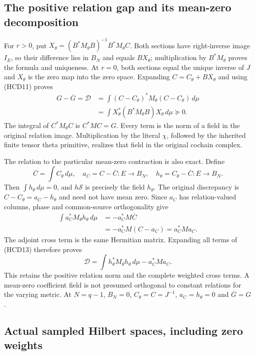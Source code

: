 \subsection{The positive relation gap and its mean-zero decomposition}

For $r>0$, put
$X_\theta=(B^*M_\theta B)^{-1}B^*M_\theta C$.
Both sections have right-inverse image $I_E$, so their difference
lies in $B_N$ and equals $BX_\theta$; multiplication by
$B^*M_\theta$ proves the formula and uniqueness.
At $r=0$, both sections equal the unique inverse of $J$ and
$X_\theta$ is the zero map into the zero space.
Expanding $C=C_\theta+BX_\theta$ and using (HCD11) proves
\[
 \boxed{
 \begin{aligned}
 G-\overline G=\mathscr D
 &=\int(C-C_\theta)^*M_\theta(C-C_\theta)\,d\mu\\
 &=\int X_\theta^*(B^*M_\theta B)X_\theta\,d\mu\succeq0.
 \end{aligned}}
 \tag{HCD13}
\]
The integral of $C^*M_\theta C$ is $C^*MC=G$.
Every term is the norm of a field in the original relation
image. Multiplication by the literal $\chi$, followed by
the inherited finite tensor theta primitive, realizes
that field in the original cochain complex.

The relation to the particular mean-zero contraction is also exact.
Define
\[
 \overline C=\int C_\theta\,d\mu,\quad
 a_C=C-\overline C:E\to B_N,\quad
 h_\theta=C_\theta-\overline C:E\to B_N.
 \tag{HCD14}
\]
Then $\int h_\theta\,d\mu=0$, and $h\mathscr S$ is precisely
the field $h_\theta$. The original discrepancy is
$C-C_\theta=a_C-h_\theta$ and need not have mean zero.
Since $a_C$ has relation-valued columns, phase and
common-source orthogonality give
\[
 \begin{split}
 \int a_C^*M_\theta h_\theta\,d\mu
 &=-a_C^*M\overline C\\
 &=-a_C^*M(C-a_C)=a_C^*Ma_C.
 \end{split}
 \tag{HCD15}
\]
The adjoint cross term is the same Hermitian matrix.
Expanding all terms of (HCD13) therefore proves
\[
 \boxed{\mathscr D
 =\int h_\theta^*M_\theta h_\theta\,d\mu-a_C^*Ma_C.}
 \tag{HCD16}
\]
This retains the positive relation norm and the complete
weighted cross terms. A mean-zero coefficient field is
not presumed orthogonal to constant relations for the
varying metric. At $N=q-1$, $B_N=0$,
$C_\theta=C=J^{-1}$, $a_C=h_\theta=0$ and $\overline G=G$.

\subsection{Actual sampled Hilbert spaces, including zero weights}

